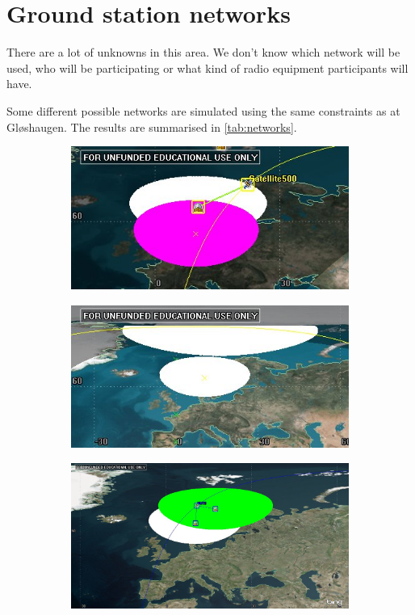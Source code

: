 \section{Ground station networks}

There are a lot of unknowns in this area. We don't know which network will be used, who will be participating or what kind of radio equipment participants will have. 

Some different possible networks are simulated using the same constraints as at Gløshaugen. The results are summarised in \autoref{tab:networks}.

\begin{figure}
\begin{subfigure}{.5\textwidth}
	\centering
	\includegraphics[width=\textwidth]{Figures/range_ntnu_aalborg}
	\label{fig:range_ntnu_aalborg}
\end{subfigure}
\begin{subfigure}{.5\textwidth}
	\centering
	\includegraphics[width=\textwidth]{Figures/range_ntnu_svalbard}
	\label{fig:range_ntnu_unis}
\end{subfigure}
\begin{subfigure}{.5\textwidth}
	\centering
	\includegraphics[width=\textwidth]{Figures/range_ntnu_narvik}

\end{subfigure}
\end{figure}

